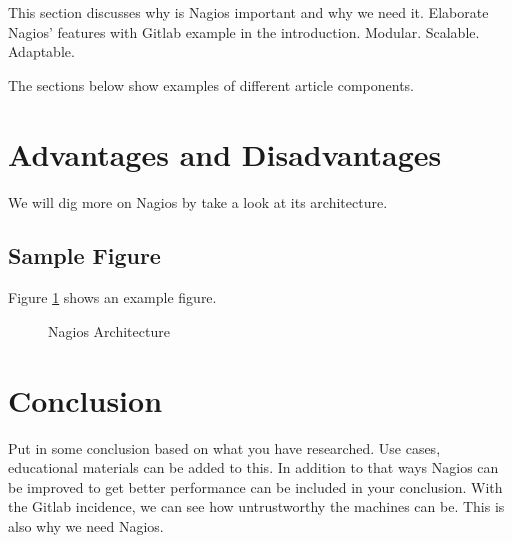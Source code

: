\documentclass[9pt,twocolumn,twoside]{styles/osajnl}
\begin{document}
This section discusses why is Nagios important and why we need it.
Elaborate Nagios' features with Gitlab example in the introduction.
Modular. Scalable. Adaptable.

\label{sec:examples}

The sections below show examples of different article components.

\section{Advantages and Disadvantages}

We will dig more on Nagios by take a look at its architecture.

\subsection{Sample Figure}

Figure \ref{fig:nagios-architecture} shows an example figure.

\begin{figure}[htbp]
\centering
{}
\caption{Nagios Architecture}
\label{fig:nagios-architecture}
\end{figure}



\section{Conclusion}
Put in some conclusion based on what you have researched.  Use cases,
educational materials can be added to this.  In addition to that ways
Nagios can be improved to get better performance can be included in
your conclusion. With the Gitlab incidence, we can see how
untrustworthy the machines can be. This is also why we need Nagios.





 

\appendix
\end{document}
